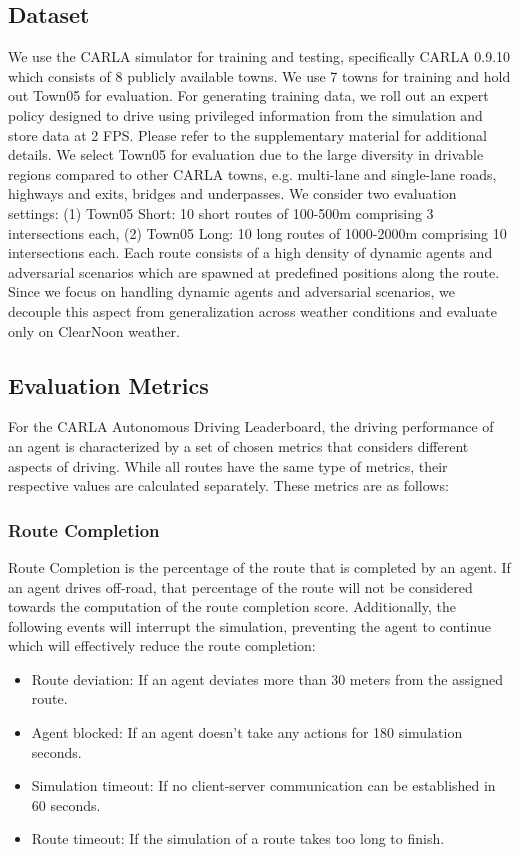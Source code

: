 \documentclass[letterpaper, 12pt]{article}
\theoremstyle{definition}
\theoremstyle{definition}
\theoremstyle{definition}
\theoremstyle{definition}
\theoremstyle{definition}
\begin{document}
\subsection{Dataset}
\label{sec:org50d486a}
We use the CARLA \cite{Dosovitskiy2017} simulator for training and testing,
specifically CARLA 0.9.10 which consists of 8 publicly available towns. We use 7
towns for training and hold out Town05 for evaluation. For generating training
data, we roll out an expert policy designed to drive using privileged
information from the simulation and store data at 2 FPS. Please refer to the
supplementary material for additional details. We select Town05 for evaluation
due to the large diversity in drivable regions compared to other CARLA towns,
e.g. multi-lane and single-lane roads, highways and exits, bridges and
underpasses. We consider two evaluation settings: (1) Town05 Short: 10 short
routes of 100-500m comprising 3 intersections each, (2) Town05 Long: 10 long
routes of 1000-2000m comprising 10 intersections each. Each route consists of
a high density of dynamic agents and adversarial scenarios which are spawned
at predefined positions along the route. Since we focus on handling dynamic
agents and adversarial scenarios, we decouple this aspect from generalization
across weather conditions and evaluate only on ClearNoon weather.
\subsection{Evaluation Metrics \label{org4074596}}
\label{sec:org2d52136}
For the CARLA Autonomous Driving Leaderboard, the driving performance of an
agent is characterized by a set of chosen metrics that considers different
aspects of driving. While all routes have the same type of metrics, their
respective values are calculated separately. These metrics are as follows:

\subsubsection{Route Completion}
\label{sec:orgf0e23e2}
Route Completion is the percentage of the route that is completed by an
agent. If an agent drives off-road, that percentage of the route will not be
considered towards the computation of the route completion score. Additionally,
the following events will interrupt the simulation, preventing the agent to
continue which will effectively reduce the route completion:

\begin{itemize}
\item Route deviation: If an agent deviates more than 30 meters from the assigned route.
\item Agent blocked: If an agent doesn’t take any actions for 180 simulation seconds.
\item Simulation timeout: If no client-server communication can be established in 60 seconds.
\item Route timeout: If the simulation of a route takes too long to finish.
\end{itemize}
\end{document}
